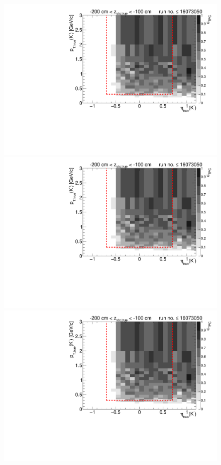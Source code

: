 \begin{figure}[hb]
{  \includegraphics[width=\linewidth,page=6]{graphics/eff/Eff2D_TPC_kaon_Minus_RunRange1.pdf}\\
  \includegraphics[width=\linewidth,page=8]{graphics/eff/Eff2D_TPC_kaon_Minus_RunRange1.pdf}\\
  \includegraphics[width=\linewidth,page=10]{graphics/eff/Eff2D_TPC_kaon_Minus_RunRange1.pdf}
}%
\end{figure}

